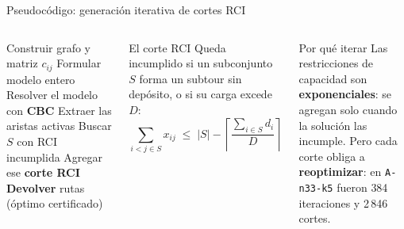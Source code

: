 \documentclass[aspectratio=169, 11pt, xcolor={dvipsnames,table}]{beamer}
\newcommand{\azul}[1]{\textcolor{UsachAzul}{#1}}
\newcommand{\naranja}[1]{\textcolor{UsachNaranja}{#1}}
\begin{document}
\begin{frame}{Pseudocódigo: generación iterativa de cortes RCI}
\begin{columns}[T]
\scriptsize
\begin{algorithm}[H]
\begin{algorithmic}[1]
  \State Construir grafo y matriz $c_{ij}$
  \State Formular modelo entero
  \Repeat
    \State Resolver el modelo con \textbf{CBC}
    \State Extraer las aristas activas
    \State Buscar $S$ con RCI incumplida
      \State Agregar ese \textbf{corte RCI}
    \EndIf
  \State \textbf{Devolver} rutas (\azul{óptimo certificado})
\EndProcedure
\end{algorithmic}
\end{algorithm}
\begin{block}{El corte RCI}
\scriptsize
Queda incumplido si un subconjunto $S$ forma un subtour sin depósito, o si su carga excede $D$:
\vspace{-4pt}
\[ \sum_{i<j \in S} x_{ij} \;\le\; |S| - \left\lceil \frac{\sum_{i \in S} d_i}{D} \right\rceil \]
\end{block}
\begin{alertblock}{Por qué iterar}
\scriptsize
Las restricciones de capacidad son \textbf{exponenciales}: se agregan \azul{solo cuando la
solución las incumple}. Pero cada corte obliga a \textbf{reoptimizar}: en \texttt{A-n33-k5}
fueron \naranja{384 iteraciones y 2\,846 cortes}.
\end{alertblock}
\end{columns}
\end{frame}
\end{document}
